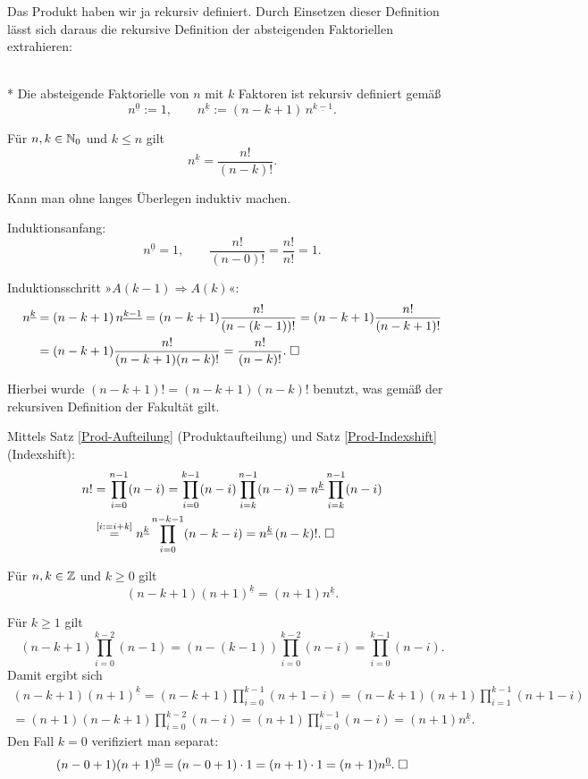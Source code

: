 Das Produkt haben wir ja rekursiv definiert. Durch Einsetzen dieser
Definition lässt sich daraus die rekursive Definition der absteigenden
Faktoriellen extrahieren:

\begin{Definition}%
%
\label{def:ffac}\mbox{}\\*
Die absteigende Faktorielle von $n$ mit $k$ Faktoren ist rekursiv
definiert gemäß%
\[n^{\underline 0} := 1,\qquad
n^{\underline k} := (n-k+1)\,n^{\underline{k-1}}.\]
\end{Definition}

\begin{Satz}\label{ffac-fac}
Für $n,k\in\mathbb N_0$ und $k\le n$ gilt
\[n^{\underline k} = \frac{n!}{(n-k)!}.\]
\end{Satz}
 Kann man ohne langes Überlegen induktiv
machen.

Induktionsanfang:
\[n^{\underline 0} = 1,\qquad \frac{n!}{(n-0)!}=\frac{n!}{n!}=1.\]

Induktionsschritt »$A(k-1)\Rightarrow A(k)$«:
\begin{align*}
n^{\underline k} &= (n-k+1)\,n^{\underline{k-1}}
= (n-k+1)\frac{n!}{(n-(k-1))!}
= (n-k+1)\frac{n!}{(n-k+1)!}\\
&= (n-k+1)\frac{n!}{(n-k+1)(n-k)!}
= \frac{n!}{(n-k)!}.\;\Box
\end{align*}

\noindent
Hierbei wurde $(n-k+1)!=(n-k+1)(n-k)!$ benutzt, was gemäß
der rekursiven Definition der Fakultät gilt.

 Mittels Satz \ref{Prod-Aufteilung}
(Produktaufteilung) und  Satz \ref{Prod-Indexshift} (Indexshift):%
\begin{align*}
n! &= \prod_{i=0}^{n-1}(n-i)
= \prod_{i=0}^{k-1} (n-i) \prod_{i=k}^{n-1} (n-i)
= n^{\underline k} \prod_{i=k}^{n-1} (n-i)\\
&\stackrel{[i:=i+k]}= n^{\underline k}\prod_{i=0}^{n-k-1} (n-k-i)
= n^{\underline k}\,(n-k)!.\;\Box
\end{align*}

\begin{Satz}\label{ffac-n-rec}
Für $n,k\in\mathbb Z$ und $k\ge 0$ gilt
\[(n-k+1)(n+1)^{\underline k} = (n+1)n^{\underline k}.\]
\end{Satz}
 Für $k\ge 1$ gilt
\[(n-k+1)\prod_{i=0}^{k-2}(n-1)
= (n-(k-1))\prod_{i=0}^{k-2} (n-i) = \prod_{i=0}^{k-1}(n-i).\]
Damit ergibt sich
\begin{gather*}
(n-k+1)(n+1)^{\underline k} = (n-k+1)\prod_{i=0}^{k-1} (n+1-i)
= (n-k+1)(n+1)\prod_{i=1}^{k-1}(n+1-i)\\
= (n+1)(n-k+1)\prod_{i=0}^{k-2}(n-i)
= (n+1)\prod_{i=0}^{k-1}(n-i)
= (n+1)n^{\underline k}.
\end{gather*}
Den Fall $k=0$ verifiziert man separat:
\[(n-0+1)(n+1)^{\underline 0}
= (n-0+1)\cdot 1 = (n+1)\cdot 1 = (n+1)n^{\underline 0}.\;\Box\]

